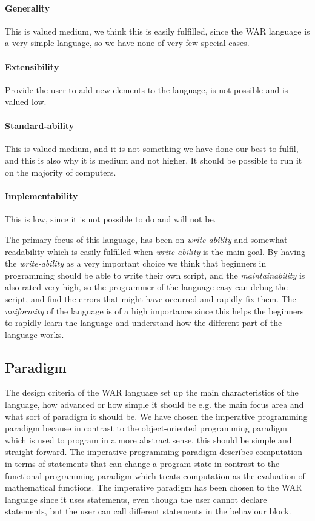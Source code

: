 \paragraph{Generality} This is valued medium, we think this is easily fulfilled, since the WAR language is a very simple language, so we have none of very few special cases.

\paragraph{Extensibility} Provide the user to add new elements to the language, is not possible and is valued low.

\paragraph{Standard-ability} This is valued medium, and it is not something we have done our best to fulfil, and this is also why it is medium and not higher. It should be possible to run it on the majority of computers.

\paragraph{Implementability} This is low, since it is not possible to do and will not be.


The primary focus of this language, has been on \textit{write-ability} and somewhat readability which is easily fulfilled when \textit{write-ability} is the main goal. By having the \textit{write-ability} as a very important choice we think that beginners in programming should be able to write their own script, and the \textit{maintainability} is also rated very high, so the programmer of the language easy can debug the script, and find the errors that might have occurred and rapidly fix them. The \textit{uniformity} of the language is of a high importance since this helps the beginners to rapidly learn the language and understand how the different part of the language works.


\subsection{Paradigm}
The design criteria of the WAR language set up the main characteristics of the language, how advanced or how simple it should be e.g. the main focus area and what sort of paradigm it should be. We have chosen the imperative programming paradigm because in contrast to the object-oriented programming paradigm which is used to program in a more abstract sense, this should be simple and straight forward. The imperative programming paradigm describes computation in terms of statements that can change a program state in contrast to the functional programming paradigm which treats computation as the evaluation of mathematical functions. The imperative paradigm has been chosen to the WAR language since it uses statements, even though the user cannot declare statements, but the user can call different statements in the behaviour block. 


